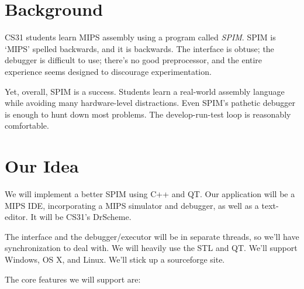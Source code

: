 
\newcommand{\longasgnname}{Final Project Proposal}
\newcommand{\duedate}{5 April 2007}



      

\section*{Background}
CS31 students learn MIPS assembly using a program called \textit{SPIM}. SPIM is `MIPS' spelled backwards, and it is backwards. The interface is obtuse; the debugger is difficult to use; there's no good preprocessor, and the entire experience seems designed to discourage experimentation.

Yet, overall, SPIM is a success. Students learn a real-world assembly language while avoiding many hardware-level distractions. Even SPIM's pathetic debugger is enough to hunt down most problems. The develop-run-test loop is reasonably comfortable.

\section*{Our Idea}
We will implement a better SPIM using C++ and QT. Our application will be a MIPS IDE, incorporating a MIPS simulator and debugger, as well as a text-editor. It will be CS31's DrScheme.

The interface and the debugger/executor will be in separate threads, so we'll have synchronization to deal with. We will heavily use the STL and QT. We'll support Windows, OS X, and Linux. We'll stick up a sourceforge site.

The core features we will support are:

